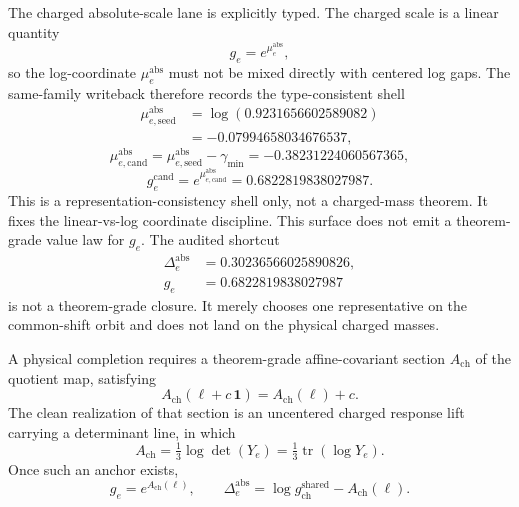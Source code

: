 \documentclass[11pt]{article}
\begin{document}
The charged absolute-scale
lane is explicitly typed. The charged scale is a linear quantity
\[
g_e = e^{\mu_e^{\mathrm{abs}}},
\]
so the log-coordinate \(\mu_e^{\mathrm{abs}}\) must not be mixed directly with centered log gaps.
The same-family writeback therefore records the type-consistent shell
\[
\begin{aligned}
\mu_{e,\mathrm{seed}}^{\mathrm{abs}}
&= \log(0.9231656602589082)\\
&= -0.07994658034676537,
\end{aligned}
\]
\[
\mu_{e,\mathrm{cand}}^{\mathrm{abs}}
=
\mu_{e,\mathrm{seed}}^{\mathrm{abs}}-\gamma_{\min}
=
-0.38231224060567365,
\]
\[
g_e^{\mathrm{cand}}
=
e^{\mu_{e,\mathrm{cand}}^{\mathrm{abs}}}
=
0.6822819838027987.
\]
This is a representation-consistency shell only, not a charged-mass theorem. It fixes the
linear-vs-log coordinate discipline. This surface does not emit a theorem-grade value law for \(g_e\).
The audited shortcut
\[
\begin{aligned}
\Delta_e^{\mathrm{abs}}&=0.30236566025890826,\\
g_e&=0.6822819838027987
\end{aligned}
\]
is not a theorem-grade closure. It merely chooses one representative on the common-shift orbit and
does not land on the physical charged masses.

A physical completion requires a theorem-grade affine-covariant section
\(A_{\mathrm{ch}}\) of the quotient map, satisfying
\[
A_{\mathrm{ch}}(\ell + c\,\mathbf 1)=A_{\mathrm{ch}}(\ell)+c.
\]
The clean realization of that section is an uncentered charged response lift carrying a
determinant line, in which
\[
A_{\mathrm{ch}}=\tfrac13 \log \det(Y_e)=\tfrac13 \operatorname{tr}(\log Y_e).
\]
Once such an anchor exists,
\[
g_e = e^{A_{\mathrm{ch}}(\ell)},
\qquad
\Delta_e^{\mathrm{abs}} = \log g_{\mathrm{ch}}^{\mathrm{shared}} - A_{\mathrm{ch}}(\ell).
\]
\end{document}
